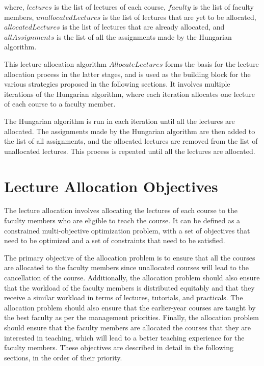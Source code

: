 where, \(lectures\) is the list of lectures of each course, \(faculty\) is the list of faculty members, \(unallocatedLectures\) is the list of lectures that are yet to be allocated, \(allocatedLectures\) is the list of lectures that are already allocated, and \(allAssignments\) is the list of all the assignments made by the Hungarian algorithm.

This lecture allocation algorithm $AllocateLectures$ forms the basis for the lecture allocation process in the latter stages, and is used as the building block for the various strategies proposed in the following sections. It involves multiple iterations of the Hungarian algorithm, where each iteration allocates one lecture of each course to a faculty member.

The Hungarian algorithm is run in each iteration until all the lectures are allocated. The assignments made by the Hungarian algorithm are then added to the list of all assignments, and the allocated lectures are removed from the list of unallocated lectures. This process is repeated until all the lectures are allocated.

\section{Lecture Allocation Objectives}
\label{sec:defining_the_allocation_problem}

The lecture allocation involves allocating the lectures of each course to the faculty members who are eligible to teach the course. It can be defined as a constrained multi-objective optimization problem, with a set of objectives that need to be optimized and a set of constraints that need to be satisfied.

The primary objective of the allocation problem is to ensure that all the courses are allocated to the faculty members since unallocated courses will lead to the cancellation of the course. Additionally, the allocation problem should also ensure that the workload of the faculty members is distributed equitably and that they receive a similar workload in terms of lectures, tutorials, and practicals. The allocation problem should also ensure that the earlier-year courses are taught by the best faculty as per the management priorities. Finally, the allocation problem should ensure that the faculty members are allocated the courses that they are interested in teaching, which will lead to a better teaching experience for the faculty members. These objectives are described in detail in the following sections, in the order of their priority.

